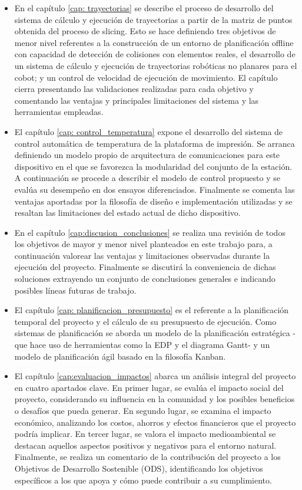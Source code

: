 \begin{itemize}
    \item En el capítulo \ref{cap: trayectorias} se describe el proceso de desarrollo del sistema de cálculo y ejecución de trayectorias a partir de la matriz de puntos obtenida del proceso de slicing. Esto se hace definiendo tres objetivos de menor nivel referentes a la construcción de un entorno de planificación offline con capacidad de detección de colisiones con elementos reales, el desarrollo de un sistema de cálculo y ejecución de trayectorias robóticas no planares para el cobot; y un control de velocidad de ejecución de movimiento. El capítulo cierra presentando las validaciones realizadas para cada objetivo y comentando las ventajas y principales limitaciones del sistema y las herramientas empleadas.

    \item El capítulo \ref{cap: control_temperatura} expone el desarrollo del sistema de control automática de temperatura de la plataforma de impresión. Se arranca definiendo un modelo propio de arquitectura de comunicaciones para este dispositivo en el que se favorezca la modularidad del conjunto de la estación. A continuación se procede a describir el modelo de control propuesto y se evalúa su desempeño en dos ensayos diferenciados. Finalmente se comenta las ventajas aportadas por la filosofía de diseño e implementación utilizadas y se resaltan las limitaciones del estado actual de dicho dispositivo.

    \item En el capítulo \ref{cap:discusion_conclusiones} se realiza una revisión de todos los objetivos de mayor y menor nivel planteados en este trabajo para, a continuación valorear las ventajas y limitaciones observadas durante la ejecución del proyecto. Finalmente se discutirá la conveniencia de dichas soluciones extrayendo un conjunto de conclusiones generales e indicando posibles líneas futuras de trabajo.

    \item El capítulo \ref{cap: planificacion_presupuesto}  es el referente a la planificación temporal del proyecto y el cálculo de su presupuesto de ejecución. Como sistemas de planificación se aborda un modelo de la planificación estratégica -que hace uso de herramientas como la \acrshort{EDP} y el diagrama Gantt- y un modelo de planificación ágil basado en la filosofía Kanban. 

    \item El capítulo \ref{cap:evaluacion_impactos} abarca un análisis integral del proyecto en cuatro apartados clave. En primer lugar, se evalúa el impacto social del proyecto, considerando su influencia en la comunidad y los posibles beneficios o desafíos que pueda generar. En segundo lugar, se examina el impacto económico, analizando los costos, ahorros y efectos financieros que el proyecto podría implicar. En tercer lugar, se valora el impacto medioambiental se destacan aquellos aspectos positivos y negativos para el entorno natural. Finalmente, se realiza un comentario de la contribución del proyecto a los Objetivos de Desarrollo Sostenible (ODS), identificando los objetivos específicos a los que apoya y cómo puede contribuir a su cumplimiento.
\end{itemize}
